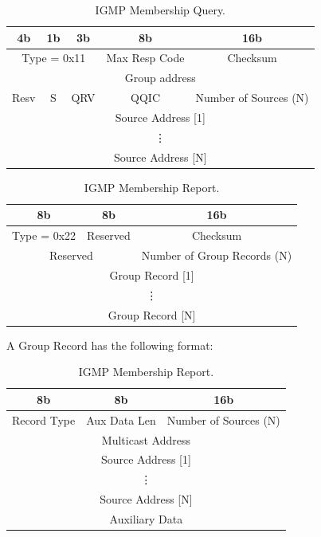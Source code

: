 \begin{table}[htp]
\centering
\begin{tabular}[t]{|c|c|c|c|c|}
4b & 1b & 3b & 8b & 16b \\
\hline	\multicolumn{3}{|c|}{Type = 0x11} & Max Resp Code & Checksum \\
\hline	\multicolumn{5}{|c|}{Group address} \\
\hline	Resv & S & QRV & QQIC & Number of Sources (N) \\
\hline	\multicolumn{5}{|c|}{Source Address [1]} \\
		\multicolumn{5}{|c|}{\vdots} \\
		\multicolumn{5}{|c|}{Source Address [N]} \\
\hline
\end{tabular}
\caption{IGMP Membership Query.}
\label{tab:IGMP-Membership-query}
\end{table}

\begin{table}[htp]
\centering
\begin{tabular}[t]{|c|c|c|}
8b & 8b & 16b \\
\hline	Type = 0x22 & Reserved & Checksum \\
\hline	\multicolumn{2}{|c|}{Reserved} & Number of Group Records (N) \\
\hline	\multicolumn{3}{|c|}{Group Record [1]} \\
		\multicolumn{3}{|c|}{\vdots} \\
		\multicolumn{3}{|c|}{Group Record [N]} \\
\hline
\end{tabular}

\begin{center}
A Group Record has the following format:
\end{center}

\begin{tabular}[t]{|c|c|c|}
8b & 8b & 16b \\
\hline	Record Type & Aux Data Len & Number of Sources (N) \\
\hline	\multicolumn{3}{|c|}{Multicast Address} \\
\hline	\multicolumn{3}{|c|}{Source Address [1]} \\
		\multicolumn{3}{|c|}{\vdots} \\
		\multicolumn{3}{|c|}{Source Address [N]} \\
\hline	\multicolumn{3}{|c|}{Auxiliary Data} \\
\hline
\end{tabular}

\caption{IGMP Membership Report.}
\label{tab:IGMP-Membership-report}
\end{table}

